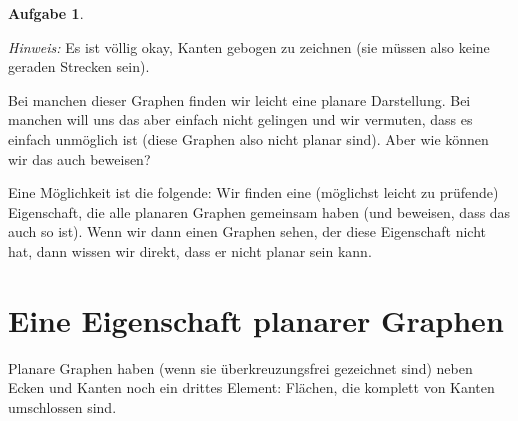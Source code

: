 \documentclass[a4paper,ngerman,12pt]{scrartcl}
\theoremstyle{definition}
\newtheorem{aufg}{Aufgabe}
\theoremstyle{plain}
\theoremstyle{remark}
\begin{document}
\begin{aufg}
\begin{center}
		\hspace{3em}
	\end{center}	
	\textit{Hinweis:} Es ist völlig okay, Kanten gebogen zu zeichnen (sie müssen also keine geraden Strecken sein).
\end{aufg}

Bei manchen dieser Graphen finden wir leicht eine planare Darstellung. Bei manchen will uns das aber einfach nicht gelingen und wir vermuten, dass es einfach unmöglich ist (diese Graphen also nicht planar sind). Aber wie können wir das auch beweisen?

Eine Möglichkeit ist die folgende: Wir finden eine (möglichst leicht zu prüfende) Eigenschaft, die alle planaren Graphen gemeinsam haben (und beweisen, dass das auch so ist). Wenn wir dann einen Graphen sehen, der diese Eigenschaft nicht hat, dann wissen wir direkt, dass er nicht planar sein kann.

\section{Eine Eigenschaft planarer Graphen}

Planare Graphen haben (wenn sie überkreuzungsfrei gezeichnet sind) neben Ecken und Kanten noch ein drittes Element: Flächen, die komplett von Kanten umschlossen sind.
\end{document}
